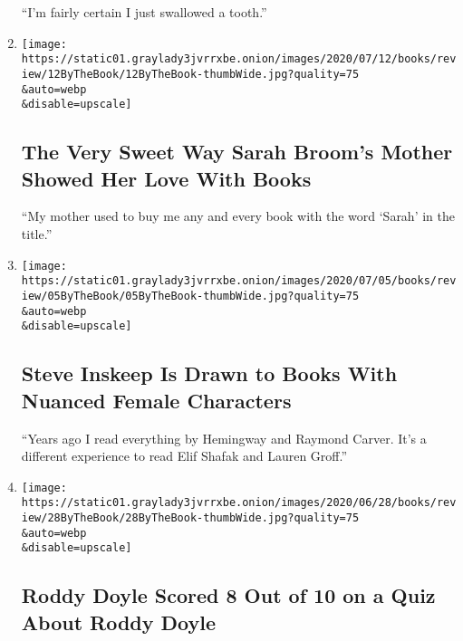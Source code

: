 \begin{enumerate}
  ``I'm fairly certain I just swallowed a tooth.''
\item
  \href{/2020/07/09/books/review/sarah-broom-by-the-book-interview.html}{}

  \texttt{[image: https://static01.graylady3jvrrxbe.onion/images/2020/07/12/books/review/12ByTheBook/12ByTheBook-thumbWide.jpg?quality=75\\\&auto=webp\\\&disable=upscale]}

  \hypertarget{the-very-sweet-way-sarah-brooms-mother-showed-her-love-with-books}{%
  \subsection{The Very Sweet Way Sarah Broom's Mother Showed Her Love
  With
  Books}\label{the-very-sweet-way-sarah-brooms-mother-showed-her-love-with-books}}

  ``My mother used to buy me any and every book with the word `Sarah' in
  the title.''
\item
  \href{/2020/07/02/books/review/steve-inskeep-by-the-book-interview.html}{}

  \texttt{[image: https://static01.graylady3jvrrxbe.onion/images/2020/07/05/books/review/05ByTheBook/05ByTheBook-thumbWide.jpg?quality=75\\\&auto=webp\\\&disable=upscale]}

  \hypertarget{steve-inskeep-is-drawn-to-books-with-nuanced-female-characters}{%
  \subsection{Steve Inskeep Is Drawn to Books With Nuanced Female
  Characters}\label{steve-inskeep-is-drawn-to-books-with-nuanced-female-characters}}

  ``Years ago I read everything by Hemingway and Raymond Carver. It's a
  different experience to read Elif Shafak and Lauren Groff.''
\item
  \href{/2020/06/25/books/review/roddy-doyle-by-the-book-interview.html}{}

  \texttt{[image: https://static01.graylady3jvrrxbe.onion/images/2020/06/28/books/review/28ByTheBook/28ByTheBook-thumbWide.jpg?quality=75\\\&auto=webp\\\&disable=upscale]}

  \hypertarget{roddy-doyle-scored-8-out-of-10-on-a-quiz-about-roddy-doyle}{%
  \subsection{Roddy Doyle Scored 8 Out of 10 on a Quiz About Roddy
  Doyle}\label{roddy-doyle-scored-8-out-of-10-on-a-quiz-about-roddy-doyle}}


\end{enumerate}
